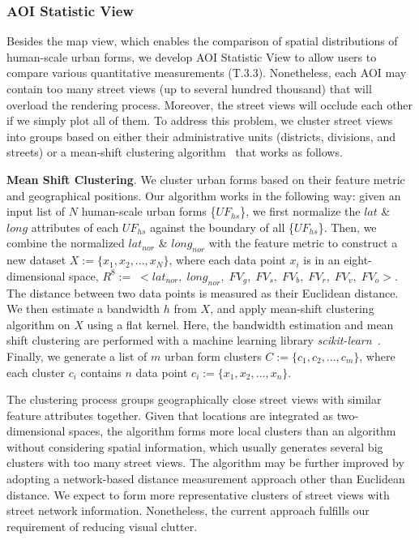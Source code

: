 \subsubsection{AOI Statistic View}
\label{sssec:statistic_view}
Besides the map view, which enables the comparison of spatial distributions of human-scale urban forms, we develop AOI Statistic View to allow users to compare various quantitative measurements (T.3.3).
Nonetheless, each AOI may contain too many street views (up to several hundred thousand) that will overload the rendering process.
Moreover, the street views will occlude each other if we simply plot all of them.
To address this problem, we cluster street views into groups based on either their administrative units (districts, divisions, and streets) or a mean-shift clustering algorithm~\cite{comaniciu_2002_meanshift} that works as follows.
 
\vspace*{2mm}
\noindent
\textbf{Mean Shift Clustering}.
We cluster urban forms based on their feature metric and geographical positions.
Our algorithm works in the following way: 
given an input list of $N$ human-scale urban forms \{$UF_{hs}$\}, we first normalize the $lat$ \& $long$ attributes of each $UF_{hs}$ against the boundary of all \{$UF_{hs}$\}.
Then, we combine the normalized $lat_{nor}$ \& $long_{nor}$ with the feature metric to construct a new dataset $X := \{x_1, x_2, ..., x_N\}$, where each data point $x_i$ is in an eight-dimensional space, $R^{8} := \; <lat_{nor}, \; long_{nor}, \; FV_g, \; FV_s, \; FV_b, \; FV_r, \; FV_v, \; FV_o>$.
The distance between two data points is measured as their Euclidean distance.
We then estimate a bandwidth $h$ from $X$, and apply mean-shift clustering algorithm on $X$ using a flat kernel.
Here, the bandwidth estimation and mean shift clustering are performed with a machine learning library \textit{scikit-learn}~\cite{scikit-learn}.
Finally, we generate a list of $m$ urban form clusters $C := \{c_1, c_2, ..., c_m\}$, where each cluster $c_i$ contains $n$ data point $c_i := \{x_1, x_2, ..., x_n\}$.

The clustering process groups geographically close street views with similar feature attributes together.
Given that locations are integrated as two-dimensional spaces, the algorithm forms more local clusters than an algorithm without considering spatial information, which usually generates several big clusters with too many street views.
The algorithm may be further improved by adopting a network-based distance measurement approach other than Euclidean distance.
We expect to form more representative clusters of street views with street network information.
Nonetheless, the current approach fulfills our requirement of reducing visual clutter.

